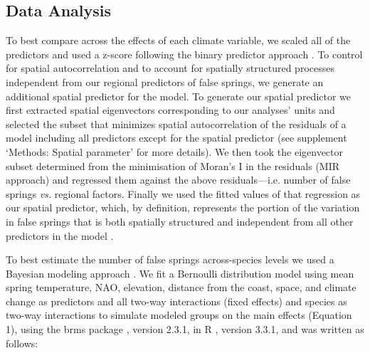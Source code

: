 \documentclass{article}\usepackage[]{graphicx}\usepackage[]{color}
\begin{document}
\subsection*{Data Analysis}
To best compare across the effects of each climate variable, we scaled all of the predictors and used a z-score following the binary predictor approach \citep{Gelman2006}. To control for spatial autocorrelation and to account for spatially structured processes independent from our regional predictors of false springs, we generate an additional spatial predictor for the model. To generate our spatial predictor we first extracted spatial eigenvectors corresponding to our analyses' units and selected the subset that minimizes spatial autocorrelation of the residuals of a model including all predictors except for the spatial predictor \citep{diniz2012selection,Baumen2017} (see supplement `Methods: Spatial parameter' for more details). We then took the eigenvector subset determined from the minimisation of Moran's I in the residuals (MIR approach) and regressed them against the above residuals---i.e. number of false springs \emph{vs.} regional factors. Finally we used the fitted values of that regression as our spatial predictor, which, by definition, represents the portion of the variation in false springs that is both spatially structured and independent from all other predictors in the model \citep[e.g. average spring temperature, altitude, etc.][]{griffith2006spatial,morales2012imprint}. %


To best estimate the number of false springs across-species levels we used a Bayesian modeling approach . We fit a Bernoulli distribution model using mean spring temperature, NAO, elevation, distance from the coast, space, and climate change as predictors and all two-way interactions (fixed effects) and species as two-way interactions to simulate modeled groups on the main effects (Equation 1), using the brms package \citep{brms}, version 2.3.1,  in R \citep{R}, version 3.3.1, and was written as follows:
\end{document}
